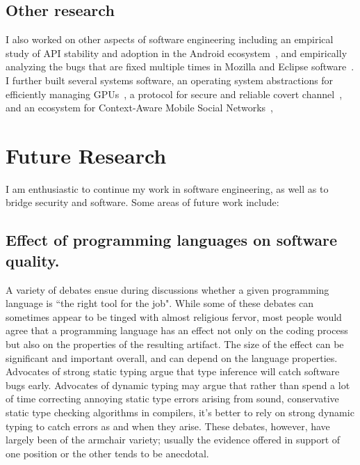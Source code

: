 \documentclass[a4paper, 11pt]{article}
\begin{document}
\begin{small}

\subsection*{\small Other research} I also worked on other aspects of software engineering including 
an empirical study of API stability and adoption in the Android ecosystem~\cite{mcdonnell2013empirical}, 
and empirically analyzing the bugs that are fixed multiple times in Mozilla and Eclipse software~\cite{park2012empirical}.
I further built several systems software, \eg an operating system abstractions for efficiently managing GPUs~\cite{rossbach2011ptask}, 
 a protocol for secure and reliable covert channel~\cite{ray2008protocol}, and an ecosystem for Context-Aware Mobile Social Networks~\cite{beach2008whozthat, beach2009touch}, 



\vspace{0.5cm}


\section*{Future Research}

I am enthusiastic to continue my work in software engineering, as well as to bridge security and software. 
Some areas of future work include:

\subsection*{\small Effect of programming languages on software quality.}
A variety of debates ensue during discussions whether a given programming language is ``the
right tool for the job". While some of these debates can sometimes appear to be tinged with
almost religious fervor, most people would agree that a programming language has an effect not
only on the coding process but also on the properties of the resulting artifact. The size of
the effect can be significant and important overall, and can depend on the language
properties. Advocates of strong static typing argue that type inference will catch software bugs early.
Advocates of dynamic typing may argue that rather than spend a lot of time correcting annoying
static type errors arising from sound, conservative static type checking algorithms in
compilers, it's better to rely on strong dynamic typing to catch errors as and when they arise.
These debates, however, have largely been of the armchair variety; usually the evidence offered
in support of one position or the other tends to be anecdotal. 


\end{small}
\end{document}
